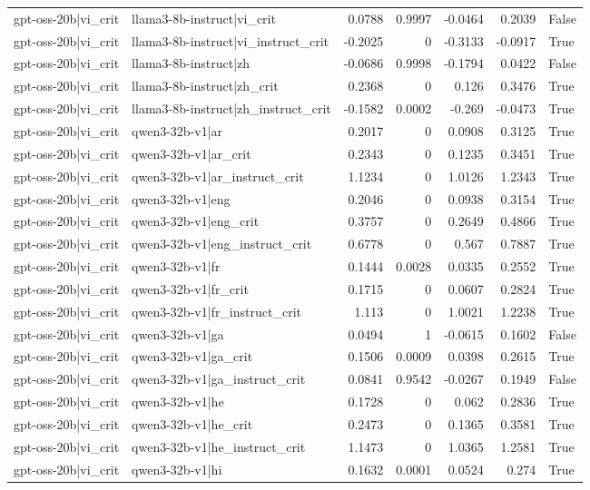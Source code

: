 \begin{table}
\begin{tabular}{l l r r r r l}
gpt-oss-20b|vi_crit & llama3-8b-instruct|vi_crit & 0.0788 & 0.9997 & -0.0464 & 0.2039 & False \\
gpt-oss-20b|vi_crit & llama3-8b-instruct|vi_instruct_crit & -0.2025 & 0 & -0.3133 & -0.0917 & True \\
gpt-oss-20b|vi_crit & llama3-8b-instruct|zh & -0.0686 & 0.9998 & -0.1794 & 0.0422 & False \\
gpt-oss-20b|vi_crit & llama3-8b-instruct|zh_crit & 0.2368 & 0 & 0.126 & 0.3476 & True \\
gpt-oss-20b|vi_crit & llama3-8b-instruct|zh_instruct_crit & -0.1582 & 0.0002 & -0.269 & -0.0473 & True \\
gpt-oss-20b|vi_crit & qwen3-32b-v1|ar & 0.2017 & 0 & 0.0908 & 0.3125 & True \\
gpt-oss-20b|vi_crit & qwen3-32b-v1|ar_crit & 0.2343 & 0 & 0.1235 & 0.3451 & True \\
gpt-oss-20b|vi_crit & qwen3-32b-v1|ar_instruct_crit & 1.1234 & 0 & 1.0126 & 1.2343 & True \\
gpt-oss-20b|vi_crit & qwen3-32b-v1|eng & 0.2046 & 0 & 0.0938 & 0.3154 & True \\
gpt-oss-20b|vi_crit & qwen3-32b-v1|eng_crit & 0.3757 & 0 & 0.2649 & 0.4866 & True \\
gpt-oss-20b|vi_crit & qwen3-32b-v1|eng_instruct_crit & 0.6778 & 0 & 0.567 & 0.7887 & True \\
gpt-oss-20b|vi_crit & qwen3-32b-v1|fr & 0.1444 & 0.0028 & 0.0335 & 0.2552 & True \\
gpt-oss-20b|vi_crit & qwen3-32b-v1|fr_crit & 0.1715 & 0 & 0.0607 & 0.2824 & True \\
gpt-oss-20b|vi_crit & qwen3-32b-v1|fr_instruct_crit & 1.113 & 0 & 1.0021 & 1.2238 & True \\
gpt-oss-20b|vi_crit & qwen3-32b-v1|ga & 0.0494 & 1 & -0.0615 & 0.1602 & False \\
gpt-oss-20b|vi_crit & qwen3-32b-v1|ga_crit & 0.1506 & 0.0009 & 0.0398 & 0.2615 & True \\
gpt-oss-20b|vi_crit & qwen3-32b-v1|ga_instruct_crit & 0.0841 & 0.9542 & -0.0267 & 0.1949 & False \\
gpt-oss-20b|vi_crit & qwen3-32b-v1|he & 0.1728 & 0 & 0.062 & 0.2836 & True \\
gpt-oss-20b|vi_crit & qwen3-32b-v1|he_crit & 0.2473 & 0 & 0.1365 & 0.3581 & True \\
gpt-oss-20b|vi_crit & qwen3-32b-v1|he_instruct_crit & 1.1473 & 0 & 1.0365 & 1.2581 & True \\
gpt-oss-20b|vi_crit & qwen3-32b-v1|hi & 0.1632 & 0.0001 & 0.0524 & 0.274 & True \\

\end{tabular}
\end{table}
